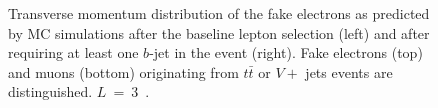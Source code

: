 \begin{figure}[h!]
\centering
{}
\vspace{-0.2cm}
\caption{Transverse momentum distribution of the fake electrons as predicted by MC simulations after the baseline lepton selection (left) and after requiring at least one $b$-jet in the event (right). Fake electrons (top) and muons (bottom) originating from $t\bar t$ or $V+$ jets events are distinguished. $L$~=~3~\ifb.}
\label{Fig:Fake_Composition_CR}  
\end{figure}
